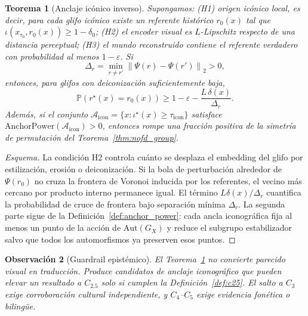 \documentclass[11pt,a4paper]{article}
\newtheorem{theorem}{Teorema}[section]
\newtheorem{remark}[theorem]{Observación}
\newcommand{\Prob}{\mathbb{P}}
\newcommand{\1}{\mathbf{1}}
\newcommand{\norm}[1]{\left\lVert #1 \right\rVert}
\numberwithin{equation}{section}
\begin{document}
\begin{theorem}[Anclaje icónico inverso]
\label{thm:inverse_iconic_grounding}
Supongamos: (H1) origen icónico local, es decir, para cada glifo icónico existe un referente histórico $r_0(x)$ tal que $\iota(x_{\tau_0},r_0(x))\geq 1-\delta_0$; (H2) el encoder visual es $L$-Lipschitz respecto de una distancia perceptual; (H3) el mundo reconstruido contiene el referente verdadero con probabilidad al menos $1-\varepsilon$. Si
\begin{equation}
    \Delta_r=\min_{r\neq r'}\norm{\Psi(r)-\Psi(r')}_2>0,
\end{equation}
entonces, para glifos con deiconización suficientemente baja,
\begin{equation}
    \Prob(r^\star(x)=r_0(x))
    \geq
    1-\varepsilon-\frac{L\,\delta(x)}{\Delta_r}.
\end{equation}
Además, si el conjunto $\mathcal{A}_{\mathrm{icon}}=\{x:\iota^\star(x)\geq \tau_{\mathrm{icon}}\}$ satisface $\mathrm{AnchorPower}(\mathcal{A}_{\mathrm{icon}})>0$, entonces rompe una fracción positiva de la simetría de permutación del Teorema~\ref{thm:nofd_group}.
\end{theorem}

\begin{proof}[Esquema]
La condición H2 controla cuánto se desplaza el embedding del glifo por estilización, erosión o deiconización. Si la bola de perturbación alrededor de $\Psi(r_0)$ no cruza la frontera de Voronoi inducida por los referentes, el vecino más cercano por producto interno permanece igual. El término $L\delta(x)/\Delta_r$ cuantifica la probabilidad de cruce de frontera bajo separación mínima $\Delta_r$. La segunda parte sigue de la Definición~\ref{def:anchor_power}: cada ancla iconográfica fija al menos un punto de la acción de $\mathrm{Aut}(G_X)$ y reduce el subgrupo estabilizador salvo que todos los automorfismos ya preserven esos puntos.
\end{proof}

\begin{remark}[Guardrail epistémico]
El Teorema~\ref{thm:inverse_iconic_grounding} no convierte parecido visual en traducción. Produce candidatos de anclaje iconográfico que pueden elevar un resultado a $C_{2.5}$ solo si cumplen la Definición~\ref{def:c25}. El salto a $C_3$ exige corroboración cultural independiente, y $C_4$--$C_5$ exige evidencia fonética o bilingüe.
\end{remark}

\end{document}
